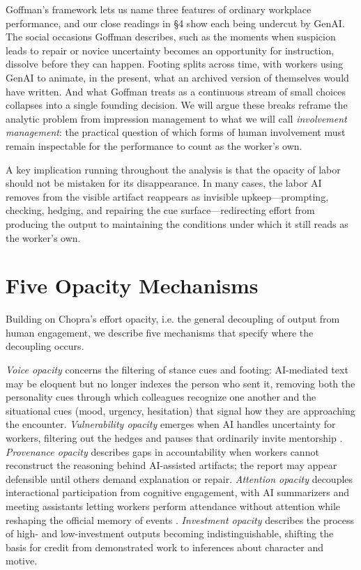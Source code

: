 \documentclass[pdflatex,sn-basic]{sn-jnl}%
\theoremstyle{thmstyleone}%
\theoremstyle{thmstyletwo}%
\theoremstyle{thmstylethree}%
\begin{document}
Goffman's framework lets us name three features of ordinary workplace performance, and our close readings in \S 4 show each being undercut by GenAI. The social occasions Goffman describes, such as the moments when suspicion leads to repair or novice uncertainty becomes an opportunity for instruction, dissolve before they can happen. Footing splits across time, with workers using GenAI to animate, in the present, what an archived version of themselves would have written. And what Goffman treats as a continuous stream of small choices collapses into a single founding decision. We will argue these breaks reframe the analytic problem from impression management to what we will call \textit{involvement management}: the practical question of which forms of human involvement must remain inspectable for the performance to count as the worker's own.

A key implication running throughout the analysis is that the opacity of labor should not be mistaken for its disappearance. In many cases, the labor AI removes from the visible artifact reappears as invisible upkeep---prompting, checking, hedging, and repairing the cue surface---redirecting effort from producing the output to maintaining the conditions under which it still reads as the worker's own.


\section{Five Opacity Mechanisms}

Building on Chopra's effort opacity, i.e. the general decoupling of output from human engagement, we describe five mechanisms that specify where the decoupling occurs.

\textit{Voice opacity} concerns the filtering of stance cues and footing: AI-mediated text may be eloquent but no longer indexes the person who sent it, removing both the personality cues through which colleagues recognize one another \citep{hyland2012disciplinary} and the situational cues (mood, urgency, hesitation) that signal how they are approaching the encounter. \textit{Vulnerability opacity} emerges when AI handles uncertainty for workers, filtering out the hedges and pauses that ordinarily invite mentorship \citep{edmondson1999psychological}. \textit{Provenance opacity} describes gaps in accountability when workers cannot reconstruct the reasoning behind AI-assisted artifacts; the report may appear defensible until others demand explanation or repair. \textit{Attention opacity} decouples interactional participation from cognitive engagement, with AI summarizers and meeting assistants letting workers perform attendance without attention while reshaping the official memory of events \citep{suchman1987plans}. \textit{Investment opacity} describes the process of high- and low-investment outputs becoming indistinguishable, shifting the basis for credit from demonstrated work to inferences about character and motive.
\end{document}
